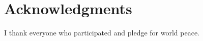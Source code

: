 \chapter*{Acknowledgments}
\thispagestyle{empty}

I thank everyone who participated and pledge for world peace.

\cleardoublepage{}
